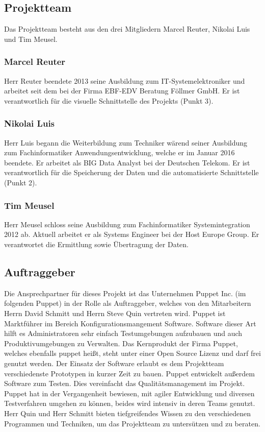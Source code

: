 \subsection{Projektteam}
Das Projektteam besteht aus den drei Mitgliedern Marcel Reuter, Nikolai Luis
und Tim Meusel.
\tm%

\subsubsection{Marcel Reuter}
Herr Reuter beendete 2013 seine Ausbildung zum IT-Systemelektroniker und
arbeitet seit dem bei der Firma EBF-EDV Beratung Föllmer GmbH. Er ist
verantwortlich für die visuelle Schnittstelle des Projekts (Punkt 3).
\mr%

\subsubsection{Nikolai Luis}
Herr Luis begann die Weiterbildung zum Techniker wärend seiner Ausbildung zum
Fachinformatiker Anwendungsentwicklung, welche er im Januar 2016 beendete. Er
arbeitet als BIG Data Analyst bei der Deutschen Telekom. Er ist verantwortlich
für die Speicherung der Daten und die automatisierte Schnittstelle (Punkt 2).
\nl%

\subsubsection{Tim Meusel}
Herr Meusel schloss seine Ausbildung zum Fachinformatiker Systemintegration
2012 ab. Aktuell arbeitet er als Systems Engineer bei der Host Europe Group.
Er verantwortet die Ermittlung sowie Übertragung der Daten.
\tm%

\subsection{Auftraggeber}
Die Ansprechpartner für dieses Projekt ist das Unternehmen Puppet Inc. (im
folgenden Puppet) in der Rolle als Auftraggeber, welches von den Mitarbeitern
Herrn David Schmitt und Herrn Steve Quin vertreten wird. Puppet ist Marktführer
im Bereich Konfigurationsmangement Software. Software dieser Art hilft es
Administratoren sehr einfach Testumgebungen aufzubauen und auch
Produktivumgebungen zu Verwalten. Das Kernprodukt der Firma Puppet, welches
ebenfalls puppet heißt, steht unter einer Open Source Lizenz und darf frei
genutzt werden. Der Einsatz der Software erlaubt es dem Projektteam
verschiedenste Prototypen in kurzer Zeit zu bauen. Puppet entwickelt außerdem
Software zum Testen. Dies vereinfacht das Qualitätsmanagement im Projekt.
Puppet hat in der Vergangenheit bewiesen, mit agiler Entwicklung und diversen
Testverfahren umgehen zu können, beides wird intensiv in deren Teams genutzt.
Herr Quin und Herr Schmitt bieten tiefgreifendes Wissen zu den verschiedenen
Programmen und Techniken, um das Projektteam zu untersützen und zu beraten.
\tm%

